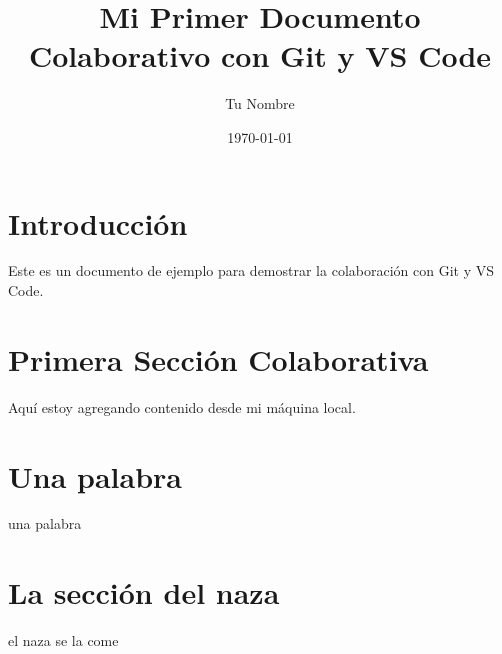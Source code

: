 \documentclass{article}
\title{Mi Primer Documento Colaborativo con Git y VS Code}
\author{Tu Nombre}
\date{\today}
\begin{document}
\maketitle

\section{Introducción}
Este es un documento de ejemplo para demostrar la colaboración con Git y VS Code.

\section{Primera Sección Colaborativa}
Aquí estoy agregando contenido desde mi máquina local.

\section{Una palabra}
una palabra

\section{La sección del naza}
el naza se la come
\end{document}
